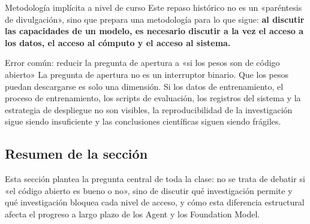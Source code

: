 \begin{knowledgebox}{Metodología implícita a nivel de curso}
Este repaso histórico no es un «paréntesis de divulgación», sino que prepara una metodología para lo que sigue:
\textbf{al discutir las capacidades de un modelo, es necesario discutir a la vez el acceso a los datos, el acceso al cómputo y el acceso al sistema.}
\end{knowledgebox}

\begin{warningbox}{Error común: reducir la pregunta de apertura a «si los pesos son de código abierto»}
La pregunta de apertura no es un interruptor binario. Que los pesos puedan descargarse es solo una dimensión. Si los datos de entrenamiento, el proceso de entrenamiento, los scripts de evaluación, los registros del sistema y la estrategia de despliegue no son visibles, la reproducibilidad de la investigación sigue siendo insuficiente y las conclusiones científicas siguen siendo frágiles.
\end{warningbox}

\subsection{Resumen de la sección}
Esta sección plantea la pregunta central de toda la clase: no se trata de debatir si «el código abierto es bueno o no», sino de discutir qué investigación permite y qué investigación bloquea cada nivel de acceso, y cómo esta diferencia estructural afecta el progreso a largo plazo de los Agent y los Foundation Model.

